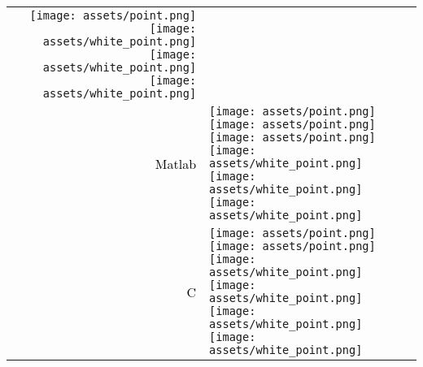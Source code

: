 \documentclass[../main.tex]{subfiles}
\begin{document}
\begin{tabular}{r l}
            \texttt{[image: assets/point.png]}
            \texttt{[image: assets/white\_point.png]}
            \texttt{[image: assets/white\_point.png]}
            \texttt{[image: assets/white\_point.png]}\\
    \textcolor{black}{\vspace*{0.2cm}Matlab} &
            \texttt{[image: assets/point.png]}
            \texttt{[image: assets/point.png]}
            \texttt{[image: assets/point.png]}
            \texttt{[image: assets/white\_point.png]}
            \texttt{[image: assets/white\_point.png]}
            \texttt{[image: assets/white\_point.png]}\\
    \textcolor{black}{\vspace*{0.2cm}C} &
            \texttt{[image: assets/point.png]}
            \texttt{[image: assets/point.png]}
            \texttt{[image: assets/white\_point.png]}
            \texttt{[image: assets/white\_point.png]}
            \texttt{[image: assets/white\_point.png]}
            \texttt{[image: assets/white\_point.png]}\\
    
            
    \end{tabular}
\end{document}

